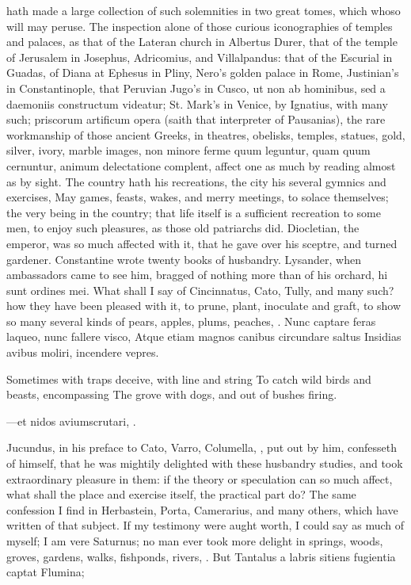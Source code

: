 {hath made a large collection of such solemnities in two great tomes,
which whoso will may peruse. The inspection alone of those curious
iconographies of temples and palaces, as that of the Lateran church in
Albertus Durer, that of the temple of Jerusalem in Josephus,
Adricomius, and Villalpandus: that of the Escurial in Guadas, of Diana
at Ephesus in Pliny, Nero's golden palace in Rome, Justinian's in
Constantinople, that Peruvian Jugo's in Cusco, ut non ab
hominibus, sed a daemoniis constructum videatur; St. Mark's in Venice,
by Ignatius, with many such; priscorum artificum opera (saith that
interpreter of Pausanias), the rare workmanship of those ancient
Greeks, in theatres, obelisks, temples, statues, gold, silver, ivory,
marble images, non minore ferme quum leguntur, quam quum cernuntur,
animum delectatione complent, affect one as much by reading almost as
by sight.
The country hath his recreations, the city his several gymnics and
exercises, May games, feasts, wakes, and merry meetings, to solace
themselves; the very being in the country; that life itself is a
sufficient recreation to some men, to enjoy such pleasures, as those
old patriarchs did. Diocletian, the emperor, was so much affected with
it, that he gave over his sceptre, and turned gardener. Constantine
wrote twenty books of husbandry. Lysander, when ambassadors came to see
him, bragged of nothing more than of his orchard, hi sunt ordines mei.
What shall I say of Cincinnatus, Cato, Tully, and many such? how they
have been pleased with it, to prune, plant, inoculate and graft, to
show so many several kinds of pears, apples, plums, peaches, \etc{}.
Nunc captare feras laqueo, nunc fallere visco,
Atque etiam magnos canibus circundare saltus
Insidias avibus moliri, incendere vepres.

Sometimes with traps deceive, with line and string
To catch wild birds and beasts, encompassing
The grove with dogs, and out of bushes firing.

---et nidos aviumscrutari, \etc{}.

Jucundus, in his preface to Cato, Varro, Columella, \etc{}, put out by
him, confesseth of himself, that he was mightily delighted with these
husbandry studies, and took extraordinary pleasure in them: if the
theory or speculation can so much affect, what shall the place and
exercise itself, the practical part do? The same confession I find in
Herbastein, Porta, Camerarius, and many others, which have written of
that subject. If my testimony were aught worth, I could say as much of
myself; I am vere Saturnus; no man ever took more delight in springs,
woods, groves, gardens, walks, fishponds, rivers, \etc{}. But
Tantalus a labris sitiens fugientia captat
Flumina;

}
